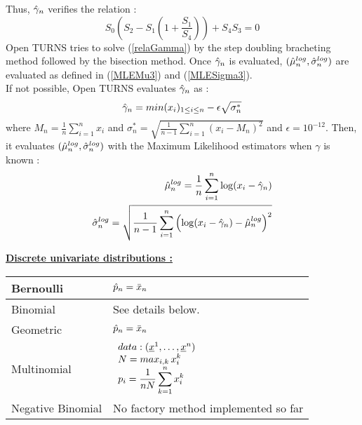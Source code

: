 {  Thus, $\Hat{\gamma}_n$ verifies the relation :
  \begin{equation} \label{relaGamma}
    S_0(S_2-S_1(1+\frac{S_1}{S_4}))+S_4S_3 = 0
  \end{equation}
  Open TURNS tries to solve (\ref{relaGamma})  by the step doubling bracheting method followed by the bisection method. Once $\Hat{\gamma}_n$ is evaluated, $(\Hat{\mu}^{log}_n, \Hat{\sigma}^{log}_n)$ are evaluated as defined in (\ref{MLEMu3}) and (\ref{MLESigma3}).\\
  If not possible, Open TURNS evaluates $\Hat{\gamma}_n$ as :
  $$
  \displaystyle \Hat{\gamma}_n = min(x_i)_{1 \leq i \leq n} - \epsilon \sqrt{\sigma_n^{*}}
  $$
  where $ \displaystyle M_n = \frac{1}{n}\sum_{i=1}^n x_i$ and $ \displaystyle \sigma_n^{*} = \sqrt{\frac{1}{n-1}\sum_{i=1}^n (x_i - M_n)^2}$ and $\epsilon = 10^{-12}$. Then, it evaluates $(\Hat{\mu}^{log}_n, \Hat{\sigma}^{log}_n)$ with the Maximum Likelihood estimators when $\gamma$ is known :
  \begin{eqnarray}
    \displaystyle\Hat{\mu}^{log}_n = \frac{1}{n}\sum_{i=1}^n\log(x_i-\Hat{\gamma}_n)\\
    \displaystyle\Hat{\sigma}^{log}_n=\sqrt{\frac{1}{n-1}\sum_{i=1}^n\left(\log(x_i-\Hat{\gamma}_n) - \Hat{\mu}^{log}_n\right)^2}
  \end{eqnarray}




  \underline{\textbf{Discrete univariate distributions :}}\\

  \begin{tabular}{|l|p{12cm}|}
    \hline
    Bernoulli & $\Hat{p}_n = \bar{x}_n$\\
    \hline
    Binomial & See details below.\\
    \hline
    Geometric & $\Hat{p}_n = \bar{x}_n$\\
    \hline
    Multinomial &
    $      \begin{array}{l}
      data : ({\underline{x}}^1, \hdots,{\underline{x}}^n)\\
      \displaystyle  N = max_{i,k} \, x_i^k \\
      \displaystyle  p_i = \frac{1}{nN} \sum_{k=1}^{n} x_i^k
    \end{array}$\\
    \hline
    Negative Binomial & No factory method implemented so far\\
    \hline
  \end{tabular}\rule{0pt}{1em}\\

}
